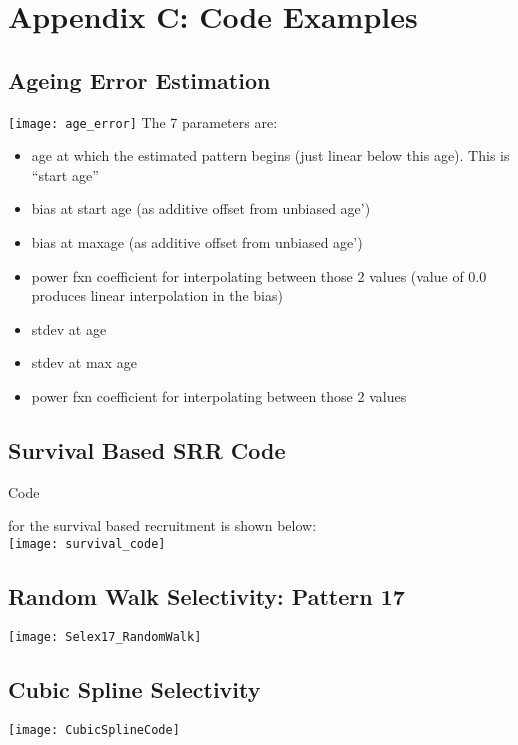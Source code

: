 \section{Appendix C: Code Examples}

\subsection{Ageing Error Estimation}
\hypertarget{AgeingError}{}
\texttt{[image: age\_error]}
The 7 parameters are:

\begin{itemize}
	\item age at which the estimated pattern begins (just linear below this age).  This is “start age”
	\item bias at start age (as additive offset from unbiased age’)
	\item bias at maxage (as additive offset from unbiased age’)
	\item power fxn coefficient for interpolating between those 2 values (value of 0.0 produces linear interpolation in the bias)
	\item stdev at age
	\item stdev at max age
	\item power fxn coefficient for interpolating between those 2 values
\end{itemize}


\subsection{Survival Based SRR Code}
\hypertarget{AppendixC}{Code} for the survival based recruitment is shown below:\\
\texttt{[image: survival\_code]}

\subsection{Random Walk Selectivity: Pattern 17}
\hypertarget{RandWalkSelex}{}
	\begin{center}
		\texttt{[image: Selex17\_RandomWalk]}
		\end{center}

\subsection{Cubic Spline Selectivity}
\hypertarget{CubicSpline}{}
	\begin{center}
		\texttt{[image: CubicSplineCode]}
	\end{center}